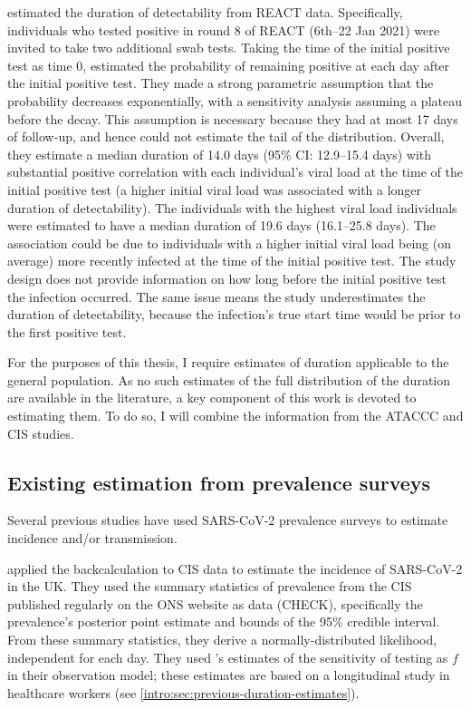 \documentclass[thesis.tex]{subfiles}
\begin{document}
\Textcite{ealesCharacterising} estimated the duration of detectability from REACT data.
Specifically, individuals who tested positive in round 8 of REACT (6th--22 Jan 2021) were invited to take two additional swab tests.
Taking the time of the initial positive test as time 0, \textcite{ealesCharacterising} estimated the probability of remaining positive at each day after the initial positive test.
They made a strong parametric assumption that the probability decreases exponentially, with a sensitivity analysis assuming a plateau before the decay.
This assumption is necessary because they had at most 17 days of follow-up, and hence could not estimate the tail of the distribution.
Overall, they estimate a median duration of 14.0 days (95\% CI: 12.9--15.4 days) with substantial positive correlation with each individual’s viral load at the time of the initial positive test (\ie a higher initial viral load was associated with a longer duration of detectability).
The individuals with the highest viral load individuals were estimated to have a median duration of 19.6 days (16.1--25.8 days).
The association could be due to individuals with a higher initial viral load being (on average) more recently infected at the time of the initial positive test.
The study design does not provide information on how long before the initial positive test the infection occurred.
The same issue means the study underestimates the duration of detectability, because the infection's true start time would be prior to the first positive test.

For the purposes of this thesis, I require estimates of duration applicable to the general population.
As no such estimates of the full distribution of the duration are available in the literature, a key component of this work is devoted to estimating them.
To do so, I will combine the information from the ATACCC and CIS studies.


\subsection{Existing estimation from prevalence surveys}

Several previous studies have used SARS-CoV-2 prevalence surveys to estimate incidence and/or transmission.

\Textcite{abbottCISincidence} applied the backcalculation to CIS data to estimate the incidence of SARS-CoV-2 in the UK. They used the summary statistics of prevalence from the CIS  published regularly on the ONS website as data (CHECK), specifically the prevalence's posterior point estimate and bounds of the 95\% credible interval. From these summary statistics, they derive a normally-distributed likelihood, independent for each day.
They used \textcite{hellewellPCRSensitivity}'s estimates of the sensitivity of testing as $f$ in their observation model; these estimates are based on a longitudinal study in healthcare workers (see \cref{intro:sec:previous-duration-estimates}).
\end{document}
